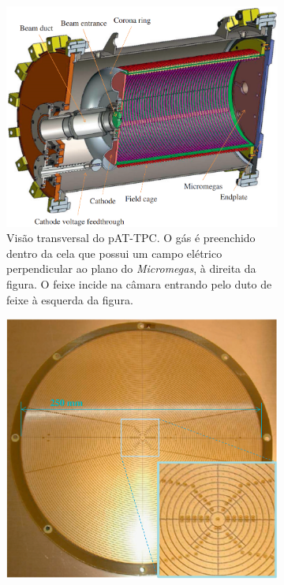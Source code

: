 \documentclass[a4paper,12pt,oneside]{book}
\begin{document}
\begin{figure}[H]
\centering
    \begin{subfigure}[t]{0.49\textwidth}
        \centering
        \includegraphics[scale=0.30]{figs/pattpc.png}
        \caption{Visão transversal do pAT-TPC. O gás é preenchido dentro da cela que possui um campo elétrico perpendicular ao plano do \textit{Micromegas}, à direita da figura. O feixe incide na câmara entrando pelo duto de feixe à esquerda da figura.}
        \label{subfig:pattpc}
    \end{subfigure}%
    \hfill
    \begin{subfigure}[t]{0.49\textwidth}
        \centering
        \includegraphics[scale=0.28]{figs/micromegas.png}

\end{subfigure}
\end{figure}
\end{document}
